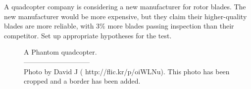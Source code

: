 \begin{exercisewrap}
\begin{nexercise}
\label{carWheelBladeManufacturer}%
A quadcopter company is considering a new manufacturer
for rotor blades.
The new manufacturer would be more expensive,
but they claim
their higher-quality blades are more reliable,
with 3\% more blades passing inspection than their
competitor.
Set up appropriate hypotheses for the test.\footnotemark
\end{nexercise}
\end{exercisewrap}

\captionsetup{width=85mm}

\begin{figure}[h]
\centering
{}
\caption{A Phantom quadcopter.\vspace{-1mm} \\
   -----------------------------\vspace{-2mm}\\
   {\footnotesize Photo by David J
   (
       {http://flic.kr/p/oiWLNu}).
   This photo has been cropped and a border has been added.}}
\label{quadcopter_david_j}
\end{figure}

\captionsetup{width=\mycaptionwidth}

\D{\newpage}


